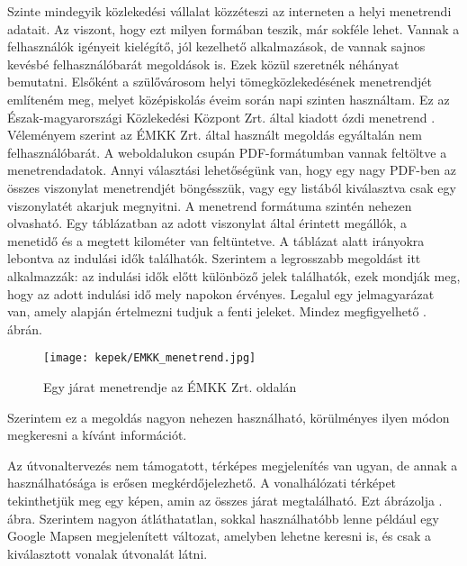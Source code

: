 


Szinte mindegyik közlekedési vállalat közzéteszi az interneten a helyi menetrendi adatait. Az viszont, hogy ezt milyen formában teszik, már sokféle lehet. Vannak a felhasználók igényeit kielégítő, jól kezelhető alkalmazások, de vannak sajnos kevésbé felhasználóbarát megoldások is. Ezek közül szeretnék néhányat bemutatni.
Elsőként a szülővárosom helyi tömegközlekedésének menetrendjét említeném meg, melyet középiskolás éveim során napi szinten használtam. Ez az Észak-magyarországi Közlekedési Központ Zrt. által kiadott ózdi menetrend \cite{emkk}. Véleményem szerint az ÉMKK Zrt. által használt megoldás egyáltalán nem felhasználóbarát. A weboldalukon csupán PDF-formátumban vannak feltöltve a menetrendadatok. Annyi választási lehetőségünk van, hogy egy nagy PDF-ben az összes viszonylat menetrendjét böngésszük, vagy egy listából kiválasztva csak egy viszonylatét akarjuk megnyitni. A menetrend formátuma szintén nehezen olvasható. Egy táblázatban az adott viszonylat által érintett megállók, a menetidő és a megtett kilométer van feltüntetve. A táblázat alatt irányokra lebontva az indulási idők találhatók. Szerintem a legrosszabb megoldást itt alkalmazzák: az indulási idők előtt különböző jelek találhatók, ezek mondják meg, hogy az adott indulási idő mely napokon érvényes. Legalul egy jelmagyarázat van, amely alapján értelmezni tudjuk a fenti jeleket. Mindez megfigyelhető . ábrán.

\begin{figure}[h!]
\centering
\texttt{[image: kepek/EMKK\_menetrend.jpg]}
\caption{Egy járat menetrendje az ÉMKK Zrt. oldalán}
\label{fig:EMKK_menetrend}
\end{figure}

Szerintem ez a megoldás nagyon nehezen használható, körülményes ilyen módon megkeresni a kívánt információt.

Az útvonaltervezés nem támogatott, térképes megjelenítés van ugyan, de annak a használhatósága is erősen megkérdőjelezhető. A vonalhálózati térképet tekinthetjük meg egy képen, amin az összes járat megtalálható. Ezt ábrázolja . ábra. Szerintem nagyon átláthatatlan, sokkal használhatóbb lenne például egy Google Mapsen megjelenített változat, amelyben lehetne keresni is, és csak a kiválasztott vonalak útvonalát látni.

